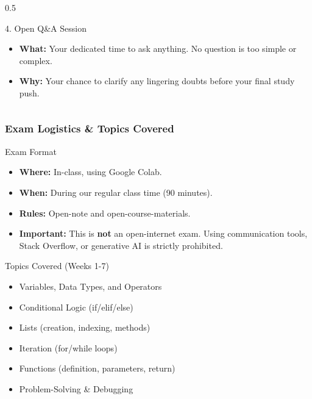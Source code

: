 \documentclass{beamer}
\begin{document}
\begin{frame}[fragile]
\begin{columns}[T]
\begin{column}{0.5\textwidth}
            \begin{block}{4. Open Q\&A Session}
                \begin{itemize}
                    \item \textbf{What:} Your dedicated time to ask anything. No question is too simple or complex.
                    \item \textbf{Why:} Your chance to clarify any lingering doubts before your final study push.
                \end{itemize}
            \end{block}
        \end{column}
    \end{columns}
    
\end{frame}

\begin{frame}[fragile]
    \frametitle{Exam Logistics \& Topics Covered}

    \begin{block}{Exam Format}
        \begin{itemize}
            \item \textbf{Where:} In-class, using Google Colab.
            \item \textbf{When:} During our regular class time (90 minutes).
            \item \textbf{Rules:} Open-note and open-course-materials.
            \item \textbf{\alert{Important:}} This is \textbf{not} an open-internet exam. Using communication tools, Stack Overflow, or generative AI is strictly prohibited.
        \end{itemize}
    \end{block}

    \begin{block}{Topics Covered (Weeks 1-7)}
        \begin{itemize}
            \item Variables, Data Types, and Operators
            \item Conditional Logic (if/elif/else)
            \item Lists (creation, indexing, methods)
            \item Iteration (for/while loops)
            \item Functions (definition, parameters, return)
            \item Problem-Solving \& Debugging
        \end{itemize}
    \end{block}
\end{frame}
\end{document}
